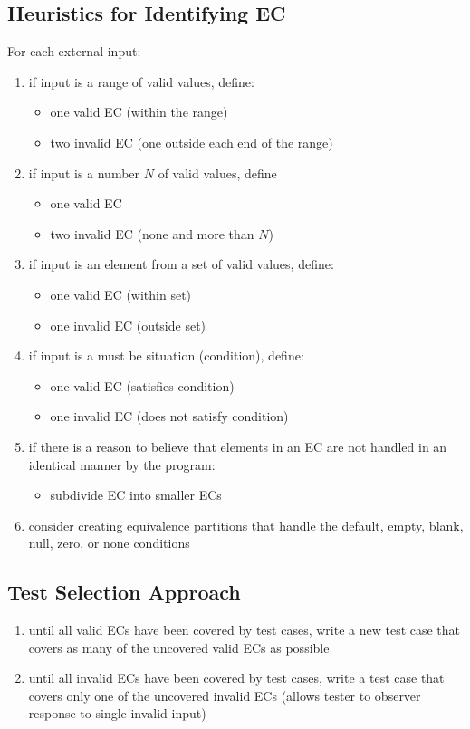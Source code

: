 \documentclass[11pt]{article}
\begin{document}
\subsection{Heuristics for Identifying EC}
\label{sec:org4c1929c}
For each external input:
\begin{enumerate}
\item if input is a range of valid values, define:
\begin{itemize}
\item one valid EC (within the range)
\item two invalid EC (one outside each end of the range)
\end{itemize}
\item if input is a number \(N\) of valid values, define
\begin{itemize}
\item one valid EC
\item two invalid EC (none and more than \(N\))
\end{itemize}
\item if input is an element from a set of valid values, define:
\begin{itemize}
\item one valid EC (within set)
\item one invalid EC (outside set)
\end{itemize}
\item if input is a must be situation (condition), define:
\begin{itemize}
\item one valid EC (satisfies condition)
\item one invalid EC (does not satisfy condition)
\end{itemize}
\item if there is a reason to believe that elements in an EC are not
handled in an identical manner by the program:
\begin{itemize}
\item subdivide EC into smaller ECs
\end{itemize}
\item consider creating equivalence partitions that handle the
default, empty, blank, null, zero, or none conditions
\end{enumerate}
\subsection{Test Selection Approach}
\label{sec:orgffa913a}
\begin{enumerate}
\item until all valid ECs have been covered by test cases,
write a new test case that covers as many of the uncovered
valid ECs as possible
\item until all invalid ECs have been covered by test cases,
write a test case that covers only one of the uncovered invalid ECs
(allows tester to observer response to single invalid input)
\end{enumerate}
\end{document}
